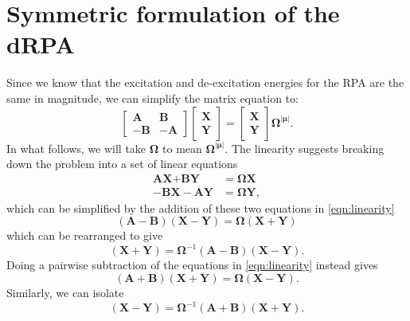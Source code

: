 \documentclass[12pt]{caltech_thesis}
\begin{document}
\chapter{Symmetric formulation of the dRPA}
\label{app:symm_drpa}
Since we know that the excitation and de-excitation energies for the RPA are the same in magnitude, we can simplify the matrix equation to:
\begin{equation}
\begin{bmatrix}
\textbf{A} & \textbf{B} \\
-\textbf{B} & -\textbf{A}
\end{bmatrix}
\begin{bmatrix}
\textbf{X} \\
\textbf{Y}
\end{bmatrix}
= 
\begin{bmatrix}
\textbf{X} \\
\textbf{Y}
\end{bmatrix}
\boldsymbol{\Omega^{|\mu|} }
.
\end{equation}
In what follows, we will take $\boldsymbol{\Omega }$ to mean $\boldsymbol{\Omega^{|\mu|} }$.
The linearity suggests breaking down the problem into a set of linear equations
\begin{align}
    \textbf{AX} + \textbf{BY} &= \boldsymbol{\Omega } \textbf{X}\\
    -\textbf{BX}-\textbf{AY} &= \boldsymbol{\Omega } \textbf{Y},
\label{eqn:linearity}
\end{align}
which can be simplified by the addition of these two equations in \ref{eqn:linearity}
\begin{equation}
    (\textbf{A}-\textbf{B})(\textbf{X}-\textbf{Y})= \boldsymbol{\Omega } (\textbf{X}+\textbf{Y})
\label{eqn:for_addition}
\end{equation}
which can be rearranged to give
\begin{equation}
    (\textbf{X}+\textbf{Y}) = \boldsymbol{\Omega }^{-1}(\textbf{A}-\textbf{B})(\textbf{X}-\textbf{Y}).
\label{eqn:addition}
\end{equation}
Doing a pairwise subtraction of the equations in \ref{eqn:linearity} instead gives
\begin{equation}
    (\textbf{A}+\textbf{B})(\textbf{X}+\textbf{Y})= \boldsymbol{\Omega } (\textbf{X}-\textbf{Y}). 
\label{eqn:for_subtraction}
\end{equation}
Similarly, we can isolate
\begin{equation}
    (\textbf{X}-\textbf{Y}) = \boldsymbol{\Omega }^{-1}(\textbf{A}+\textbf{B})(\textbf{X}+\textbf{Y}).
\label{eqn:subtraction}
\end{equation}
\end{document}
